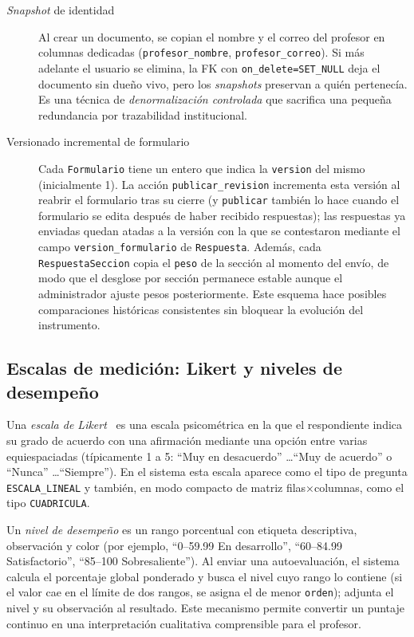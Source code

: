 \begin{description}
    \item[\emph{Snapshot} de identidad] Al crear un documento, se copian el nombre y el correo del profesor en columnas dedicadas (\texttt{profesor\_nombre}, \texttt{profesor\_correo}). Si más adelante el usuario se elimina, la FK con \texttt{on\_delete=SET\_NULL} deja el documento sin dueño vivo, pero los \emph{snapshots} preservan a quién pertenecía. Es una técnica de \emph{denormalización controlada} que sacrifica una pequeña redundancia por trazabilidad institucional.
    \item[Versionado incremental de formulario] Cada \texttt{Formulario} tiene un entero que indica la \texttt{version} del mismo (inicialmente 1). La acción \texttt{publicar\_revision} incrementa esta versión al reabrir el formulario tras su cierre (y \texttt{publicar} también lo hace cuando el formulario se edita después de haber recibido respuestas); las respuestas ya enviadas quedan atadas a la versión con la que se contestaron mediante el campo \texttt{version\_formulario} de \texttt{Respuesta}. Además, cada \texttt{RespuestaSeccion} copia el \texttt{peso} de la sección al momento del envío, de modo que el desglose por sección permanece estable aunque el administrador ajuste pesos posteriormente. Este esquema hace posibles comparaciones históricas consistentes sin bloquear la evolución del instrumento.
\end{description}

\subsection{Escalas de medición: Likert y niveles de desempeño}\label{subsec:likert}

Una \emph{escala de Likert}~\cite{likert1932} es una escala psicométrica en la que el respondiente indica su grado de acuerdo con una afirmación mediante una opción entre varias equiespaciadas (típicamente 1 a 5: ``Muy en desacuerdo'' \ldots ``Muy de acuerdo'' o ``Nunca'' \ldots ``Siempre''). En el sistema esta escala aparece como el tipo de pregunta \texttt{ESCALA\_LINEAL} y también, en modo compacto de matriz filas×columnas, como el tipo \texttt{CUADRICULA}.

Un \emph{nivel de desempeño} es un rango porcentual con etiqueta descriptiva, observación y color (por ejemplo, ``0--59.99 En desarrollo'', ``60--84.99 Satisfactorio'', ``85--100 Sobresaliente''). Al enviar una autoevaluación, el sistema calcula el porcentaje global ponderado y busca el nivel cuyo rango lo contiene (si el valor cae en el límite de dos rangos, se asigna el de menor \texttt{orden}); adjunta el nivel y su observación al resultado. Este mecanismo permite convertir un puntaje continuo en una interpretación cualitativa comprensible para el profesor.

